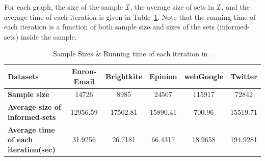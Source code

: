 For each graph, the size of the sample $\mathcal{I}$, the average size of sets in $\mathcal{I}$, and the average time of each iteration is given in Table~\ref{table:time}. Note that the running time of each iteration is a function of both sample size and sizes of the sets (informed-sets) inside the sample.

\begin{table}[h]
\begin{tabular}{|l|c|c|c|c|c|}
\hline
{\bf Datasets}& Enron-Email & Brightkite & Epinion  & webGoogle & Twitter\\
\hline \hline
{\bf Sample size}& 14726 & 8985 & 24507 & 115917 & 72842 \\
\hline
{\bf Average size of informed-sets}& 12956.59 & 17502.81 & 15890.41 & 700.96  & 15519.71 \\
\hline
{\bf Average time of each iteration(sec)}& 31.9256 & 26.7181&  66.4317&  18.9658&  194.9281\\
\hline
\end{tabular}
\caption{Sample Sizes \& Running time of each iteration in \algonameapx.}\label{table:time}
\end{table}




